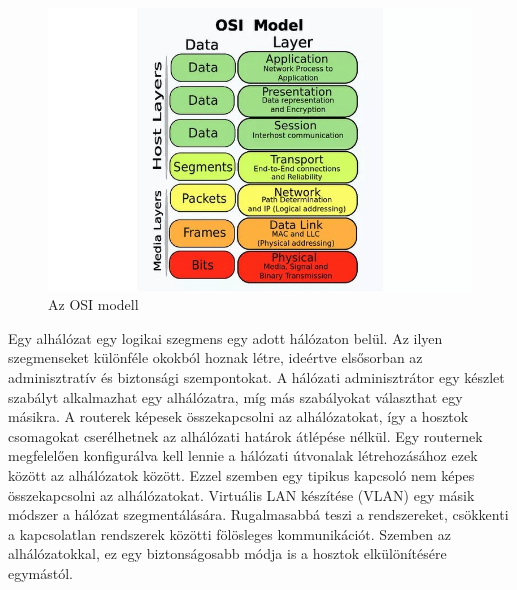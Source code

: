 \begin{figure}[H]
	\centering
	\includegraphics[width=150mm, keepaspectratio]{figures/osi_modell.jpg}
	\caption{Az OSI modell}
	\label {fig:osi_modell}
\end{figure}

Egy alhálózat egy logikai szegmens egy adott hálózaton belül. Az ilyen szegmenseket
különféle okokból hoznak létre, ideértve elsősorban az adminisztratív és biztonsági
szempontokat. A hálózati adminisztrátor egy készlet szabályt alkalmazhat egy
alhálózatra, míg más szabályokat választhat egy másikra. A routerek képesek
összekapcsolni az alhálózatokat, így a hosztok csomagokat cserélhetnek az
alhálózati határok átlépése nélkül. Egy routernek megfelelően konfigurálva kell
lennie a hálózati útvonalak létrehozásához ezek között az alhálózatok között.
Ezzel szemben egy tipikus kapcsoló nem képes összekapcsolni az alhálózatokat.
Virtuális LAN készítése (VLAN) egy másik módszer a hálózat szegmentálására. 
Rugalmasabbá teszi a rendszereket, csökkenti a kapcsolatlan rendszerek közötti fölösleges kommunikációt.
Szemben az alhálózatokkal, ez egy biztonságosabb módja is a hosztok elkülönítésére egymástól.

